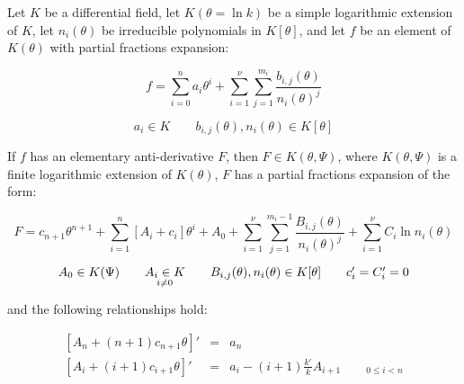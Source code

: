 \theorem\label{logarithmic integration theorem}
Let $K$ be a differential field, let $K(\theta = \ln k)$ be a simple
logarithmic extension of $K$, let $n_i(\theta)$ be
irreducible polynomials in $K[\theta]$,
and let $f$ be an element of $K(\theta)$
with partial fractions expansion:

\begin{equation}
\label{logarithmic integration theorem - integrand}
f = \sum_{i=0}^n a_i \theta^i
+ \sum_{i=1}^\nu \sum_{j=1}^{m_i} \frac{b_{i,j}(\theta)}{n_i(\theta)^j}
\end{equation}

$$a_i \in K \qquad b_{i,j}(\theta),n_i(\theta) \in K[\theta]$$

If $f$ has
an elementary anti-derivative $F$, then $F \in K(\theta, \Psi)$,
where $K(\theta, \Psi)$ is a finite logarithmic extension
of $K(\theta)$, $F$ has a partial fractions expansion of the form:


\begin{equation}
\label{logarithmic integration theorem - integral}
F = c_{n+1} \theta^{n+1} + \sum_{i=1}^{n} \left[ A_i + c_i \right] \theta^i + A_0
+ \sum_{i=1}^\nu \sum_{j=1}^{m_i-1} \frac{B_{i,j}(\theta)}{n_i(\theta)^j}
+ \sum_{i=1}^\nu C_i \ln n_i(\theta)
\end{equation}

\begin{equation*}
\arraycolsep=10pt\def\arraystretch{0}
\begin{array}{cccc}
A_0 \in K(\Psi) & A_i \in K & B_{i,j}(\theta),n_i(\theta) \in K[\theta] & c_i' = C_i' = 0 \\
& {}_{i \ne 0} & &
\end{array}
\end{equation*}

and the following relationships hold:

\begin{subequations}
\begin{eqnarray}
\label{eq: logarithmic An}
\left[ A_n + (n+1) c_{n+1} \theta \right]' &=& a_n \\
\label{eq: logarithmic Ai's}
\left[ A_i + (i+1) c_{i+1} \theta \right]' &=& a_i - (i+1) \frac{k'}{k} A_{i+1} \qquad {}_{0\le i<n}
\end{eqnarray}
\end{subequations}

